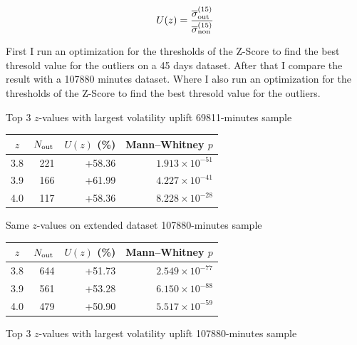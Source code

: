 \documentclass[12pt]{article}
\begin{document}
\begin{equation}\label{eq:vol_ratio}
U(z) =\frac{ \overline{\sigma}^{(15)}_{\rm out}}{\overline{\sigma}^{(15)}_{\rm non}}
\end{equation}


First I run an optimization for the thresholds of the Z-Score to find the best thresold value for the outliers on a 45 days dataset.
After that I compare the result with a 107880 minutes dataset. Where I also run an optimization for the thresholds of the Z-Score to find the best thresold value for the outliers.


Top 3 $z$-values with largest volatility uplift 69811-minutes sample

\begin{table}[H]
  \centering
  
  \label{tap:top3-z}
  \begin{tabular}{@{} c  r  r  r @{}}  
    \toprule
    $z$ & $N_{\rm out}$ & $U(z)$ (\%) & Mann–Whitney $p$ \\  
  \midrule
  3.8 & 221 &  +58.36 & $1.913\times10^{-51}$ \\  
  3.9 & 166 & +61.99 & $4.227\times10^{-41}$ \\  
  4.0 & 117 & +58.36 & $8.228\times10^{-28}$ \\ 
\bottomrule
\end{tabular}

\end{table}

Same $z$-values on extended dataset 107880-minutes sample

\begin{table}[H]
  \centering
  
  \label{tap:old-z-values-out-of-sample}
  \begin{tabular}{@{} c  r  r  r @{}}  
    \toprule
    $z$ & $N_{\rm out}$ & $U(z)$ (\%) & Mann–Whitney $p$ \\  
  \midrule
  3.8 & 644 & +51.73 & $2.549\times10^{-77}$ \\  
  3.9 & 561 & +53.28 & $6.150\times10^{-88}$ \\  
  4.0 & 479 & +50.90 & $5.517\times10^{-59}$ \\ 
\bottomrule
\end{tabular}

\end{table}





Top 3 $z$-values with largest volatility uplift 107880-minutes sample
\end{document}
